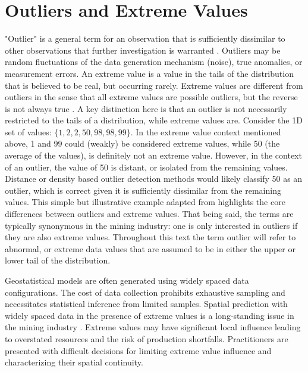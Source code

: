 \FloatBarrier
\section{Outliers and Extreme Values}
\label{sec:02extreme}

"Outlier" is a general term for an observation that is sufficiently dissimilar to other observations that further investigation is warranted \citep{barnett1984outliers}. Outliers may be random fluctuations of the data generation mechanism (noise), true anomalies, or measurement errors. An extreme value is a value in the tails of the distribution that is believed to be real, but occurring rarely. Extreme values are different from outliers in the sense that all extreme values are possible outliers, but the reverse is not always true \citep{aggarwal2016outlier}. A key distinction here is that an outlier is not necessarily restricted to the tails of a distribution, while extreme values are. Consider the \gls{1D} set of values: $\{1,2,2,50,98,98,99\}$. In the extreme value context mentioned above, 1 and 99 could (weakly) be considered extreme values, while 50 (the average of the values), is definitely not an extreme value. However, in the context of an outlier, the value of 50 is distant, or isolated from the remaining values. Distance or density based outlier detection methods would likely classify 50 as an outlier, which is correct given it is sufficiently dissimilar from the remaining values. This simple but illustrative example adapted from \cite{aggarwal2016outlier} highlights the core differences between outliers and extreme values. That being said, the terms are typically synonymous in the mining industry: one is only interested in outliers if they are also extreme values. Throughout this text the term outlier will refer to abnormal, or extreme data values that are assumed to be in either the upper or lower tail of the distribution.

Geostatistical models are often generated using widely spaced data configurations. The cost of data collection prohibits exhaustive sampling and necessitates statistical inference from limited samples. Spatial prediction with widely spaced data in the presence of extreme values is a long-standing issue in the mining industry \citep{leuangthong2015dealing}. Extreme values may have significant local influence leading to overstated resources and the risk of production shortfalls. Practitioners are presented with difficult decisions for limiting extreme value influence and characterizing their spatial continuity.

